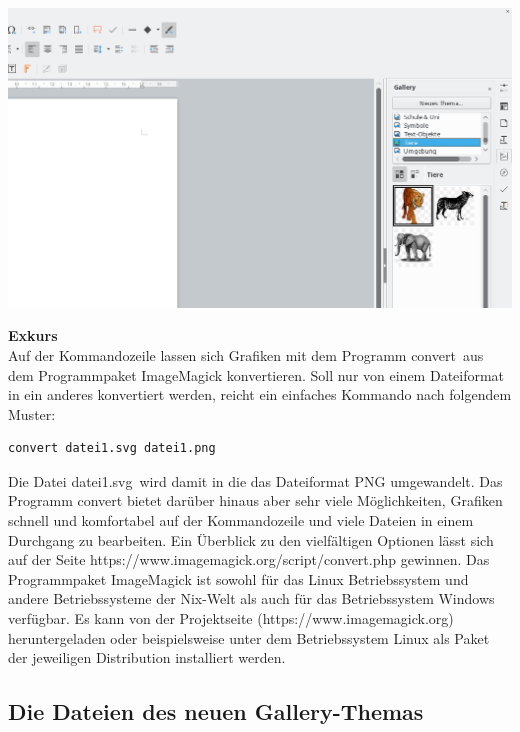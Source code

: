 \documentclass[a4paper,10pt,pagesize,titlepage]{scrbook}
\begin{document}
\begin{center}
	\includegraphics[width=0.9\linewidth]{pics/libreoffice_gallery_new_theme_with_graphics}
	\label{fig:libreoffice_gallery_new_theme_with_graphics}
\end{center}


\bigskip\textbf{Exkurs}
\\

Auf der Kommandozeile lassen sich Grafiken mit dem Programm \glqq convert\grqq~aus dem Programmpaket ImageMagick konvertieren. Soll nur von einem Dateiformat in ein anderes konvertiert werden, reicht ein einfaches Kommando nach folgendem Muster:
\begin{lstlisting}
convert datei1.svg datei1.png
\end{lstlisting}

Die Datei \glqq datei1.svg\grqq~wird damit in die das Dateiformat PNG umgewandelt. Das Programm convert bietet darüber hinaus aber sehr viele Möglichkeiten, Grafiken schnell und komfortabel auf der Kommandozeile und viele Dateien in einem Durchgang zu bearbeiten.
Ein Überblick zu den vielfältigen Optionen lässt sich auf der Seite https://www.imagemagick.org/script/convert.php gewinnen. Das Programmpaket ImageMagick ist sowohl für das Linux Betriebssystem und andere Betriebssysteme der Nix-Welt als auch für das Betriebssystem Windows verfügbar. Es kann von der Projektseite (https://www.imagemagick.org) heruntergeladen oder beispielsweise unter dem Betriebssystem Linux als Paket der jeweiligen Distribution installiert werden.

\subsection{Die Dateien des neuen Gallery-Themas}
\end{document}
